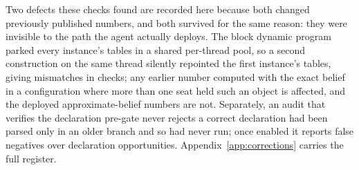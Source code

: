 Two defects these checks found are recorded here because both changed previously published numbers,
and both survived for the same reason: they were invisible to the path the agent actually deploys.
The block dynamic program parked every instance's tables in a shared per-thread pool, so a second
construction on the same thread silently repointed the first instance's tables, giving
\numAliasMismatch{} mismatches in \numAliasChecks{} checks; any earlier number computed with the
exact belief in a configuration where more than one seat held such an object is affected, and the
deployed approximate-belief numbers are not. Separately, an audit that verifies the declaration
pre-gate never rejects a correct declaration had been parsed only in an older branch and so had never
run; once enabled it reports \vsixGateFalseNeg{} false negatives over \vsixGateOpportunities{}
declaration opportunities. Appendix~\ref{app:corrections} carries the full register.
